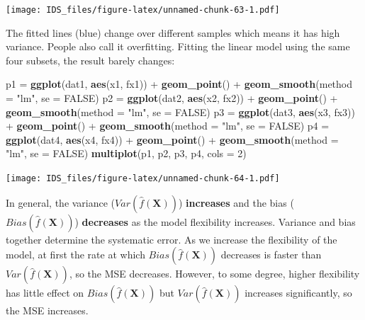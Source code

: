 \documentclass[12pt,]{krantz}
\newenvironment{Shaded}{\begin{snugshade}}{\end{snugshade}}
\newcommand{\KeywordTok}[1]{\textcolor[rgb]{0.13,0.29,0.53}{\textbf{{#1}}}}
\newcommand{\DataTypeTok}[1]{\textcolor[rgb]{0.13,0.29,0.53}{{#1}}}
\newcommand{\DecValTok}[1]{\textcolor[rgb]{0.00,0.00,0.81}{{#1}}}
\newcommand{\StringTok}[1]{\textcolor[rgb]{0.31,0.60,0.02}{{#1}}}
\newcommand{\OtherTok}[1]{\textcolor[rgb]{0.56,0.35,0.01}{{#1}}}
\newcommand{\NormalTok}[1]{{#1}}
\theoremstyle{definition}
\theoremstyle{definition}
\theoremstyle{remark}
\begin{document}
\texttt{[image: IDS\_files/figure-latex/unnamed-chunk-63-1.pdf]}

The fitted lines (blue) change over different samples which means it has
high variance. People also call it overfitting. Fitting the linear model
using the same four subsets, the result barely changes:

\begin{Shaded}
\begin{Highlighting}[]
\NormalTok{p1 =}\StringTok{ }\KeywordTok{ggplot}\NormalTok{(dat1, }\KeywordTok{aes}\NormalTok{(x1, fx1)) +}\StringTok{ }\KeywordTok{geom_point}\NormalTok{() +}\StringTok{ }\KeywordTok{geom_smooth}\NormalTok{(}\DataTypeTok{method =} \StringTok{"lm"}\NormalTok{, }
    \DataTypeTok{se =} \OtherTok{FALSE}\NormalTok{)}
\NormalTok{p2 =}\StringTok{ }\KeywordTok{ggplot}\NormalTok{(dat2, }\KeywordTok{aes}\NormalTok{(x2, fx2)) +}\StringTok{ }\KeywordTok{geom_point}\NormalTok{() +}\StringTok{ }\KeywordTok{geom_smooth}\NormalTok{(}\DataTypeTok{method =} \StringTok{"lm"}\NormalTok{, }
    \DataTypeTok{se =} \OtherTok{FALSE}\NormalTok{)}
\NormalTok{p3 =}\StringTok{ }\KeywordTok{ggplot}\NormalTok{(dat3, }\KeywordTok{aes}\NormalTok{(x3, fx3)) +}\StringTok{ }\KeywordTok{geom_point}\NormalTok{() +}\StringTok{ }\KeywordTok{geom_smooth}\NormalTok{(}\DataTypeTok{method =} \StringTok{"lm"}\NormalTok{, }
    \DataTypeTok{se =} \OtherTok{FALSE}\NormalTok{)}
\NormalTok{p4 =}\StringTok{ }\KeywordTok{ggplot}\NormalTok{(dat4, }\KeywordTok{aes}\NormalTok{(x4, fx4)) +}\StringTok{ }\KeywordTok{geom_point}\NormalTok{() +}\StringTok{ }\KeywordTok{geom_smooth}\NormalTok{(}\DataTypeTok{method =} \StringTok{"lm"}\NormalTok{, }
    \DataTypeTok{se =} \OtherTok{FALSE}\NormalTok{)}
\KeywordTok{multiplot}\NormalTok{(p1, p2, p3, p4, }\DataTypeTok{cols =} \DecValTok{2}\NormalTok{)}
\end{Highlighting}
\end{Shaded}

\texttt{[image: IDS\_files/figure-latex/unnamed-chunk-64-1.pdf]}

In general, the variance (\(Var(\hat{f}(\mathbf{X}))\))
\textbf{increases} and the bias (\(Bias(\hat{f}(\mathbf{X}))\))
\textbf{decreases} as the model flexibility increases. Variance and bias
together determine the systematic error. As we increase the flexibility
of the model, at first the rate at which \(Bias(\hat{f}(\mathbf{X}))\)
decreases is faster than \(Var (\hat{f} (\mathbf{X}))\), so the MSE
decreases. However, to some degree, higher flexibility has little effect
on \(Bias(\hat{f}(\mathbf{X}))\) but \(Var(\hat{f} (\mathbf{X}))\)
increases significantly, so the MSE increases.
\end{document}
